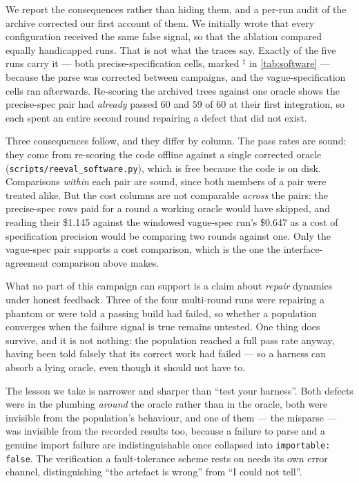 \documentclass[10pt,twocolumn]{article}
\theoremstyle{definition}
\theoremstyle{plain}
\newcommand{\code}[1]{\texttt{\small #1}}
\begin{document}
We report the consequences rather than hiding them, and a per-run audit of the archive
corrected our first account of them. We initially wrote that every configuration
received the same false signal, so that the ablation compared equally handicapped runs.
That is not what the traces say. Exactly \NPhantomRounds{} of the five runs carry it ---
both precise-specification cells, marked $^\ddagger$ in \cref{tab:software} --- because
the parse was corrected between campaigns, and the vague-specification cells ran
afterwards. Re-scoring the archived trees against one oracle shows the precise-spec
pair had \emph{already} passed 60 and 59 of 60 at their first integration, so each spent
an entire second round repairing a defect that did not exist.

Three consequences follow, and they differ by column. The pass rates are sound: they
come from re-scoring the code offline against a single corrected oracle
(\code{scripts/reeval\_software.py}), which is free because the code is on disk.
Comparisons \emph{within} each pair are sound, since both members of a pair were treated
alike. But the cost columns are not comparable \emph{across} the pairs: the precise-spec
rows paid for a round a working oracle would have skipped, and reading their
\$1.145 against the windowed vague-spec run's \$0.647 as a cost of specification
precision would be comparing two rounds against one. Only the vague-spec pair supports
a cost comparison, which is the one the interface-agreement comparison above makes.

What no part of this campaign can support is a claim about \emph{repair} dynamics under
honest feedback. Three of the four multi-round runs were repairing a phantom or were
told a passing build had failed, so whether a population converges when the failure
signal is true remains untested. One thing does survive, and it is not nothing: the
population reached a full pass rate anyway, having been told falsely that its correct
work had failed --- so a harness can absorb a lying oracle, even though it should not have
to.

The lesson we take is narrower and sharper than ``test your harness''. Both defects were
in the plumbing \emph{around} the oracle rather than in the oracle, both were invisible
from the population's behaviour, and one of them --- the misparse --- was invisible from
the recorded results too, because a failure to parse and a genuine import failure are
indistinguishable once collapsed into \code{importable: false}. The verification a
fault-tolerance scheme rests on needs its own error channel, distinguishing ``the
artefact is wrong'' from ``I could not tell''.
\end{document}
